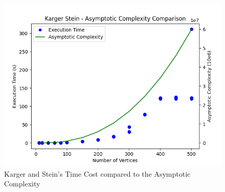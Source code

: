 \begin{figure}[H]
	\hspace{0cm}\includegraphics[width=17cm]{Img/KargerSteinComplexityGraph120.png}
	\caption{Karger and Stein's Time Cost compared to the Asymptotic Complexity}
\end{figure}



\pagebreak